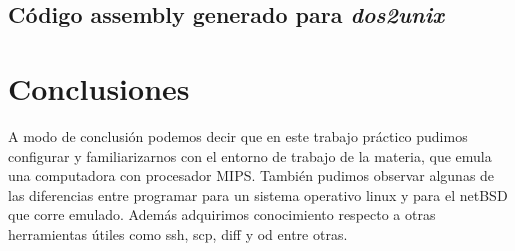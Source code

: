 \documentclass[a4paper,10pt, spanish]{article}
\begin{document}
\subsection{Código assembly generado para \textit{dos2unix}}


\section{Conclusiones}

A modo de conclusión podemos decir que en este trabajo práctico pudimos configurar y familiarizarnos con el entorno de trabajo de la materia, que emula una computadora con procesador MIPS. 
También pudimos observar algunas de las diferencias entre programar para un sistema operativo linux y para el netBSD que corre emulado. Además adquirimos conocimiento respecto a otras herramientas útiles como ssh, scp, diff y od entre otras.
\end{document}
